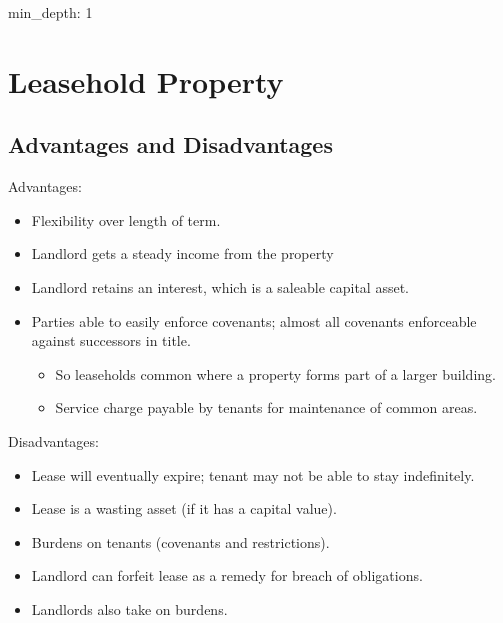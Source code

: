 \documentclass[
]{article}
\author{}
\date{}
\newenvironment{Shaded}{}{}
\newcommand{\NormalTok}[1]{#1}
\providecommand{\tightlist}{%
  \setlength{\itemsep}{0pt}\setlength{\parskip}{0pt}}
\begin{document}
{
\setcounter{tocdepth}{3}
\tableofcontents
}
\begin{Shaded}
\begin{Highlighting}[]
\NormalTok{min\_depth: 1}
\end{Highlighting}
\end{Shaded}

\hypertarget{leasehold-property}{%
\section{Leasehold Property}\label{leasehold-property}}

\hypertarget{advantages-and-disadvantages}{%
\subsection{Advantages and
Disadvantages}\label{advantages-and-disadvantages}}

Advantages:

\begin{itemize}
\tightlist
\item
  Flexibility over length of term.
\item
  Landlord gets a steady income from the property
\item
  Landlord retains an interest, which is a saleable capital asset.
\item
  Parties able to easily enforce covenants; almost all covenants
  enforceable against successors in title.

  \begin{itemize}
  \tightlist
  \item
    So leaseholds common where a property forms part of a larger
    building.
  \item
    Service charge payable by tenants for maintenance of common areas.
  \end{itemize}
\end{itemize}

Disadvantages:

\begin{itemize}
\tightlist
\item
  Lease will eventually expire; tenant may not be able to stay
  indefinitely.
\item
  Lease is a wasting asset (if it has a capital value).
\item
  Burdens on tenants (covenants and restrictions).
\item
  Landlord can forfeit lease as a remedy for breach of obligations.
\item
  Landlords also take on burdens.
\end{itemize}
\end{document}
